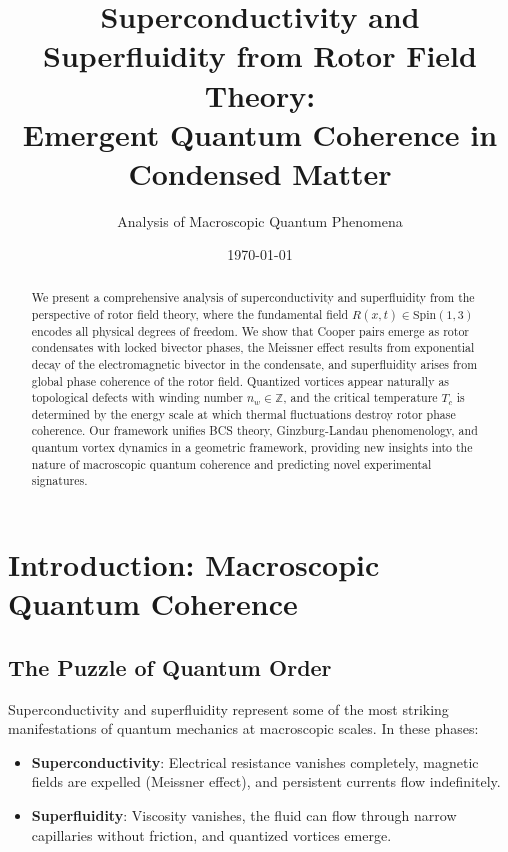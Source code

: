 \documentclass[12pt,a4paper]{article}
\title{Superconductivity and Superfluidity from Rotor Field Theory:\\
Emergent Quantum Coherence in Condensed Matter}
\author{Analysis of Macroscopic Quantum Phenomena}
\date{\today}
\theoremstyle{definition}
\theoremstyle{remark}
\begin{document}
\maketitle

\begin{abstract}
We present a comprehensive analysis of superconductivity and superfluidity from the perspective of rotor field theory, where the fundamental field $R(x,t) \in \mathrm{Spin}(1,3)$ encodes all physical degrees of freedom. We show that Cooper pairs emerge as rotor condensates with locked bivector phases, the Meissner effect results from exponential decay of the electromagnetic bivector in the condensate, and superfluidity arises from global phase coherence of the rotor field. Quantized vortices appear naturally as topological defects with winding number $n_w \in \mathbb{Z}$, and the critical temperature $T_c$ is determined by the energy scale at which thermal fluctuations destroy rotor phase coherence. Our framework unifies BCS theory, Ginzburg-Landau phenomenology, and quantum vortex dynamics in a geometric framework, providing new insights into the nature of macroscopic quantum coherence and predicting novel experimental signatures.
\end{abstract}

\tableofcontents
\newpage

\section{Introduction: Macroscopic Quantum Coherence}

\subsection{The Puzzle of Quantum Order}

Superconductivity and superfluidity represent some of the most striking manifestations of quantum mechanics at macroscopic scales. In these phases:

\begin{itemize}[leftmargin=*]
\item \textbf{Superconductivity}: Electrical resistance vanishes completely, magnetic fields are expelled (Meissner effect), and persistent currents flow indefinitely.
\item \textbf{Superfluidity}: Viscosity vanishes, the fluid can flow through narrow capillaries without friction, and quantized vortices emerge.
\end{itemize}
\end{document}
